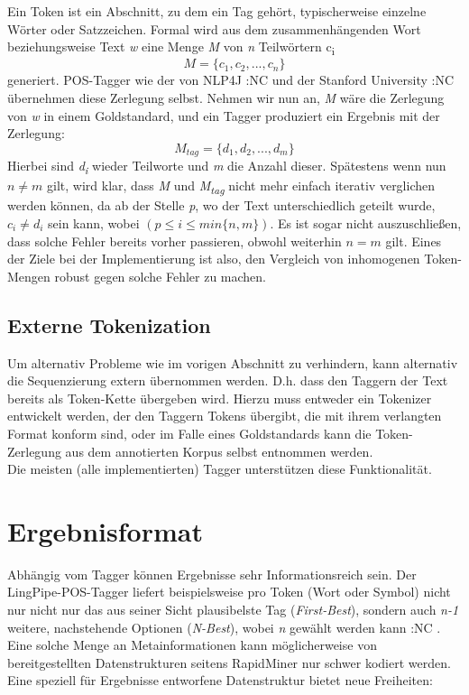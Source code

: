 Ein Token ist ein Abschnitt, zu dem ein Tag gehört, typischerweise einzelne Wörter oder Satzzeichen. Formal wird aus dem zusammenhängenden Wort beziehungsweise Text \textit{w} eine Menge \textit{M} von \textit{n} Teilwörtern c\textsubscript{i} 
 \[  M = \{ c_1 , c_2 , ... , c_n \} \] 
 generiert. POS-Tagger wie der von NLP4J :NC und der Stanford University :NC übernehmen diese Zerlegung selbst. Nehmen wir nun an, \textit{M} wäre die Zerlegung von \textit{w} in einem Goldstandard, und ein Tagger produziert ein Ergebnis mit der Zerlegung:
 \[  M_{tag} = \{ d_1 , d_2 , ... , d_m \} \]
Hierbei sind \textit{d\textsubscript{i}} wieder Teilworte und \textit{m} die Anzahl dieser. Spätestens wenn nun $n \neq m$ gilt, wird klar, dass \textit{M} und \textit{M\textsubscript{tag}} nicht mehr einfach iterativ verglichen werden können, da ab der Stelle \textit{p}, wo der Text unterschiedlich geteilt wurde, $ c_i \neq d_i $ sein kann, wobei $ (p \leq i \leq min\{ n, m \}) $. Es ist sogar nicht auszuschließen, dass solche Fehler bereits vorher passieren, obwohl weiterhin $n = m$ gilt.
\newline
Eines der Ziele bei der Implementierung ist also, den Vergleich von inhomogenen Token-Mengen robust gegen solche Fehler zu machen. 

\subsection{Externe Tokenization}
Um alternativ Probleme wie im vorigen Abschnitt zu verhindern, kann alternativ die Sequenzierung extern übernommen werden. D.h. dass den Taggern der Text bereits als Token-Kette übergeben wird. Hierzu muss entweder ein Tokenizer entwickelt werden, der den Taggern Tokens übergibt, die mit ihrem verlangten Format konform sind, oder im Falle eines Goldstandards kann die Token-Zerlegung aus dem annotierten Korpus selbst entnommen werden.
\\ Die meisten (alle implementierten) Tagger unterstützen diese Funktionalität.



\section{Ergebnisformat}
Abhängig vom Tagger können Ergebnisse sehr Informationsreich sein. Der LingPipe-POS-Tagger liefert beispielsweise pro Token (Wort oder Symbol) nicht nur nicht nur das aus seiner Sicht plausibelste Tag (\textit{First-Best}), sondern auch \textit{n-1} weitere, nachstehende Optionen (\textit{N-Best}), wobei \textit{n} gewählt werden kann :NC . Eine solche Menge an Metainformationen kann möglicherweise von bereitgestellten Datenstrukturen seitens RapidMiner nur schwer kodiert werden. Eine speziell für Ergebnisse entworfene Datenstruktur bietet neue Freiheiten:

